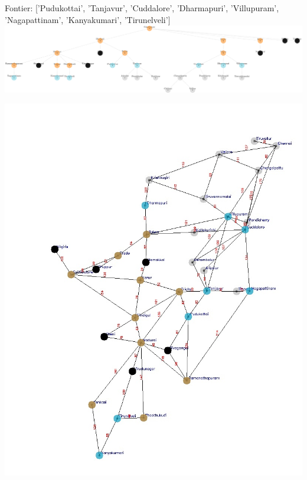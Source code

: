 \documentclass[xcolor=table]{beamer}
\begin{document}
\begin{frame}
  { \tiny Fontier: ['Pudukottai', 'Tanjavur', 'Cuddalore', 'Dharmapuri', 'Villupuram', 'Nagapattinam', 'Kanyakumari', 'Tirunelveli']}
  \includegraphics[width=1\textwidth]{../BFSNodes/24-1.png}
  \begin{center}
    \includegraphics[height=0.6\textheight]{../BFSoutput/tamilBFS22.jpg}
  \end{center}
\end{frame}
\end{document}
